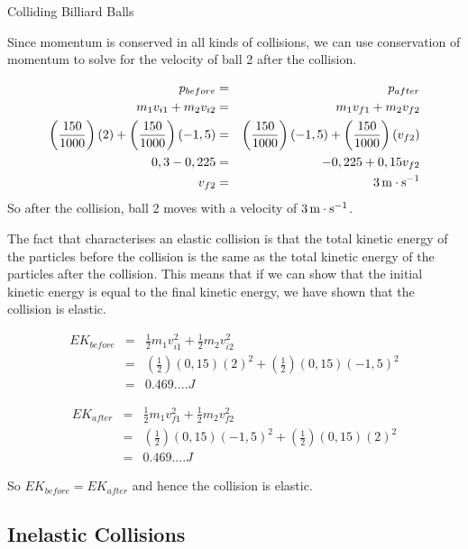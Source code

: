 \begin{wex}{Colliding Billiard Balls}
{  
  Since momentum is conserved in all kinds of collisions, we can use
  conservation of momentum to solve for the velocity of ball 2 after
  the collision.

  \begin{eqnarray*}
    p_{before}&=&p_{after}\\
    m_1v_{i1}+m_2v_{i2}&=&m_1v_{f1}+m_2v_{f2}\\
    \left( \frac{150}{1000}\right) (2)+\left( \frac{150}{1000} \right)(-1,5) &=& \left( \frac{150}{1000} \right)(-1,5)+\left( \frac{150}{1000} \right)(v_{f2})\\
    0,3-0,225&=&-0,225+0,15v_{f2}\\
    v_{f2}&=&3\,\mathrm{m \cdot s^{-1}}
  \end{eqnarray*}
  So after the collision, ball 2 moves with a velocity of $3\,\mathrm{m \cdot s^{-1}}$.

  The fact that characterises an elastic collision is that the total
  kinetic energy of the particles before the collision is the same as
  the total kinetic energy of the particles after the collision. This
  means that if we can show that the initial kinetic energy is equal
  to the final kinetic energy, we have shown that the collision is
  elastic.

  \begin{eqnarray*}
    EK_{before}&=&\frac{1}{2}m_1v_{i1}^2+\frac{1}{2}m_2v_{i2}^2\\
    &=&\left(\frac{1}{2}\right) (0,15)(2)^2+\left(\frac{1}{2}\right)(0,15)(-1,5)^2\\
    &=&0.469....J
  \end{eqnarray*}

  \begin{eqnarray*}
    EK_{after}&=&\frac{1}{2}m_1v_{f1}^2+\frac{1}{2}m_2v_{f2}^2\\
    &=&\left(\frac{1}{2}\right)(0,15)(-1,5)^2+\left(\frac{1}{2}\right) (0,15)(2)^2\\
    &=&0.469....J
  \end{eqnarray*}

  So $EK_{before}=EK_{after}$ and hence the collision is elastic.
}
\end{wex}


\subsection{Inelastic Collisions}

